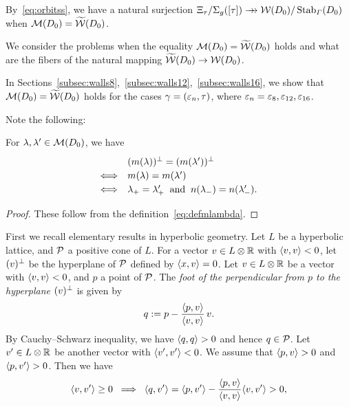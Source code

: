 \documentclass{amsart} %
\begin{document}
%
\begin{remark}\label{rem:orbitss}
By~\eqref{eq:orbitss},
we have 
a natural surjection 
$ \Xi_{\tau}/\Sigma_{g}([\tau]) \mathrel{\rightarrow\!\!\!\!\rightarrow} \mathord{\mathcal{W}}(D_0)/\operatorname{Stab}_{\varGamma}(D_0)$
when $ \mathord{\mathcal{M}}(D_0)=\widetilde{\mathord{\mathcal{W}}}(D_0)$.
\end{remark}
%
We consider the problems when 
the equality $\mathord{\mathcal{M}}(D_0)=\widetilde{\mathord{\mathcal{W}}} (D_0)$ holds and 
what are the fibers of the natural mapping $\widetilde{\mathord{\mathcal{W}}} (D_0)\to \mathord{\mathcal{W}}(D_0)$.
%
\begin{remark}
In Sections~\ref{subsec:walls8},~\ref{subsec:walls12},~\ref{subsec:walls16}, 
we show that $\mathord{\mathcal{M}}(D_0)=\widetilde{\mathord{\mathcal{W}}} (D_0)$ holds
for the cases $\gamma=(\varepsilon_n, \tau)$,
where $\varepsilon_n=\varepsilon_8, \varepsilon_{12}, \varepsilon_{16}$.
\end{remark}
%
Note the following:
%
\begin{lemma}\label{lem:mmequal}
For $\lambda, \lambda^{\prime}\in \mathord{\mathcal{M}}(D_0)$, we have 
\[
\renewcommand{\arraystretch}{1.2}
\begin{array}{cl}
&(m(\lambda))\sperp=(m(\lambda\sprime))\sperp\\
\Longleftrightarrow & m(\lambda)=m(\lambda\sprime) \\
\Longleftrightarrow & \lambdaplus=\lambdaplus\sprime\;\;\textrm{and}\;\; 
n(\lambdaminus)=n(\lambdaminus\sprime).
\end{array}
\]
\end{lemma}
%
\begin{proof}
These follow from the definition~\eqref{eq:defmlambda}.
\end{proof}
%
%
First we recall elementary results in hyperbolic geometry.
Let $L$ be a hyperbolic lattice, and $\mathord{\mathcal{P}}$ a positive cone of $L$.
For a vector $v\in L\otimes\mathord{\mathbb{R}}$ with $\langle v, v \rangle<0$,
let $(v)^{\perp}$ be the hyperplane of $\mathord{\mathcal{P}}$ defined by $\langle x, v \rangle=0$.
Let $v\in L\otimes\mathord{\mathbb{R}}$ be a vector with $\langle v, v \rangle<0$, and 
$p$ a point of $\mathord{\mathcal{P}}$.
The \emph{foot of the perpendicular from $p$ to the hyperplane $(v)^{\perp}$ }
is given by
\[
q:=p-\frac{\langle p, v \rangle}{\langle v,v \rangle}\, v.
\]
By Cauchy--Schwarz inequality,
we have $\langle q, q \rangle>0$
and hence 
$q\in \mathord{\mathcal{P}}$.
Let $v^{\prime}\in L\otimes\mathord{\mathbb{R}}$ be another vector with $\langle v^{\prime}, v^{\prime} \rangle<0$.
We assume that $\langle p, v \rangle>0$ and $\langle p, v^{\prime} \rangle>0$.
Then we have
%
\begin{equation}\label{eq:ifvvsprime}
\langle v, v^{\prime} \rangle\ge 0 \;\;\Longrightarrow \;\; \langle q, v^{\prime} \rangle=
\langle p, v^{\prime} \rangle-\dfrac{\langle p, v \rangle}{\langle v,v \rangle} \langle v, v^{\prime} \rangle>0,
\end{equation}
\end{document}
